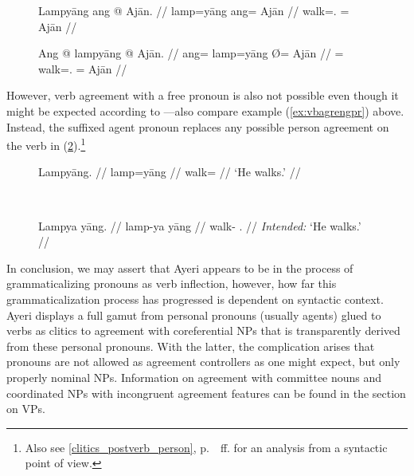 \begin{figure}[h]
\pex\label{ex:subjclitcoref} %
\a\ljudge* \begingl
	\gla Lampyāng ang @ Ajān. //
	\glb lamp=yāng ang= ​Ajān //
	\glc walk=\TsgM{}.\Aarg{} \Aarg{}= Ajān //
\endgl

\a\ljudge* \begingl	
	\gla Ang @ lampyāng {} @ Ajān. //
	\glb ang= lamp=yāng Ø= ​Ajān //
	\glc \AgtT{}= walk=\TsgM{}.\Aarg{} \Top{}= ​Ajān //
\endgl
\xe
\end{figure}

However, verb agreement with a free pronoun is also not possible even though it
might be expected according to \citep[109]{corbett2006}---also compare example
(\ref{ex:vbagrengpr}) above. Instead, the suffixed agent pronoun replaces any
possible person agreement on the verb in (\ref{ex:proclitcoref}).\footnote{Also
see \autoref{clitics_postverb_person}, p.~\pageref{clitics_postverb_person}~ff.
for an analysis from a syntactic point of view.}

\begin{figure}[h]
\ex{}\label{ex:proclitcoref} %
\begin{minipage}[t]{.5\remaining}
\tl\quad\begingl
	\gla Lampyāng. //
	\glb lamp=yāng //
	\glc walk=\TsgM{} //
	\glft `He walks.' //
\endgl
\end{minipage}
~
\begin{minipage}[t]{.5\remaining}
\tl\quad\ljudge* \begingl	
	\gla Lampya yāng. //
	\glb lamp-ya yāng //
	\glc walk-\TsgM{} \TsgM{}.\Aarg{} //
	\glft \textit{Intended:} `He walks.' //
\endgl
\end{minipage}
\xe
\end{figure}

In conclusion, we may assert that Ayeri appears to be in the process of
grammaticalizing pronouns as verb inflection, however, how far this
grammaticalization process has progressed is dependent on syntactic context.
Ayeri displays a full gamut from personal pronouns (usually agents) glued to
verbs as clitics to agreement with coreferential NPs that is transparently
derived from these personal pronouns. With the latter, the complication arises
that pronouns are not allowed as agreement controllers as one might expect, but
only properly nominal NPs. Information on agreement with committee nouns and
coordinated NPs with incongruent agreement features can be found in the section
on VPs.

